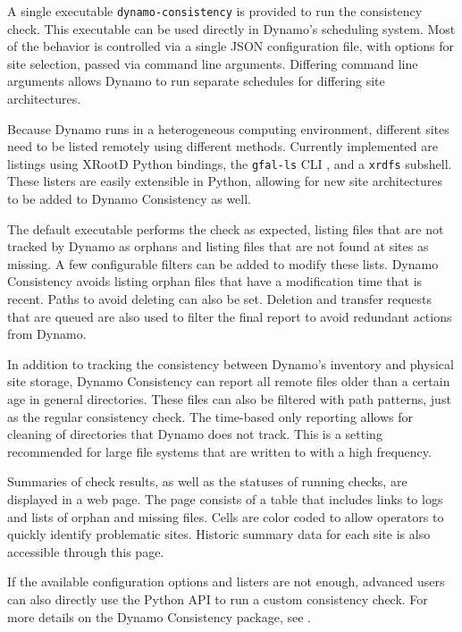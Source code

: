 A single executable \texttt{dynamo-consistency} is provided to run the consistency check.
This executable can be used directly in Dynamo’s scheduling system.
Most of the behavior is controlled via a single JSON configuration file,
with options for site selection, passed via command line arguments.
Differing command line arguments allows Dynamo to run separate schedules
for differing site architectures.

Because Dynamo runs in a heterogeneous computing environment,
different sites need to be listed remotely using different methods.
Currently implemented are listings using XRootD Python bindings,
the \texttt{gfal-ls} CLI \cite{laure2006programming}, and a \texttt{xrdfs} subshell.
These listers are easily extensible in Python,
allowing for new site architectures to be added to Dynamo Consistency as well.

The default executable performs the check as expected,
listing files that are not tracked by Dynamo as orphans
and listing files that are not found at sites as missing.
A few configurable filters can be added to modify these lists.
Dynamo Consistency avoids listing orphan files that have a modification time that is recent.
Paths to avoid deleting can also be set.
Deletion and transfer requests that are queued are also used to filter the final report
to avoid redundant actions from Dynamo.

In addition to tracking the consistency between Dynamo’s inventory and physical site storage,
Dynamo Consistency can report all remote files older than a certain age
in general directories.
These files can also be filtered with path patterns, just as the regular consistency check.
The time-based only reporting allows for cleaning of directories that Dynamo does not track.
This is a setting recommended for large file systems
that are written to with a high frequency.

Summaries of check results, as well as the statuses of running checks,
are displayed in a web page.
The page consists of a table that includes links to logs and
lists of orphan and missing files.
Cells are color coded to allow operators to quickly identify problematic sites.
Historic summary data for each site is also accessible through this page.

If the available configuration options and listers are not enough,
advanced users can also directly use the Python API to run a custom consistency check.
For more details on the Dynamo Consistency package,
see \cite{dynamo_consistency}.

